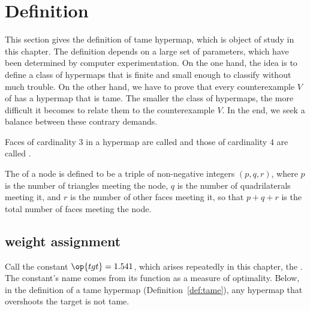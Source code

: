 \section{Definition}

This section gives the definition of tame hypermap, which is object of study in
this chapter.    The definition depends on a large set of parameters, which have
been determined by computer experimentation.  On the one hand, the idea is to define a class
of hypermaps that is finite and small enough to classify without much trouble.
On the other hand, we have to prove that every counterexample $V$ of 
has a hypermap that is tame.  The smaller the class of hypermaps, the more difficult
it becomes to relate them to the counterexample $V$.  In the end, we seek a balance
between these contrary demands.


\begin{definition}
  Faces of cardinality $3$ in a hypermap are called
   and those of cardinality $4$ are called
  .
%
%
%
%
\end{definition}

\begin{definition}[type,~$(p,q,r)$]\label{definition:type}
The  of a node is defined to be a triple of
non-negative integers $(p,q,r)$, where $p$ is the number of
triangles meeting the node, $q$ is the number of quadrilaterals
meeting it, and $r$ is the number of other faces meeting it, so that
$p+q+r$ is the total number of faces meeting the node.
%
%
%
\end{definition}


\subsection{weight assignment}\label{sec:wtassign}
%

Call the constant $\op{tgt}=1.541$, which arises repeatedly in this
chapter, the .  The constant's name comes from its
function as a measure of optimality. Below, in the definition of a tame
hypermap (Definition~\ref{def:tame}), any hypermap that overshoots the
target is not tame.  
%
%
%


